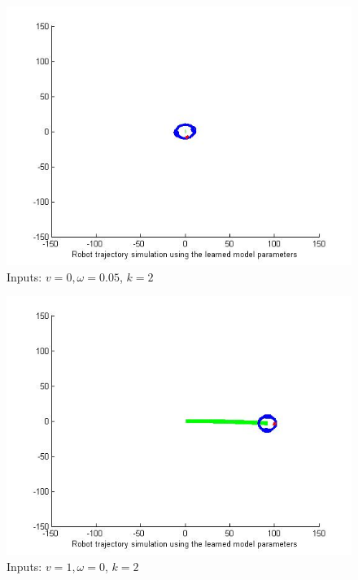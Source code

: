 \documentclass[10pt,a4paper]{report}
\begin{document}
\begin{figure}[!ht]
	\graphicspath{{./Exercise1/}}
	\centering
	\includegraphics[scale=0.5]{k_2_fig_2}	
	
	\begin{flushleft}
	\caption{Inputs: $v=0,\omega=0.05$, $k=2$}
	\end{flushleft}
	\label{fig:fig_2}
	
\end{figure}

\begin{figure}[!ht]
	\graphicspath{{./Exercise1/}}
	\centering
	\includegraphics[scale=0.5]{k_2_fig_3}	
	
	\begin{flushleft}
	\caption{Inputs: $v=1,\omega=0$, $k=2$}
	\end{flushleft}
	\label{fig:fig_3}
	
\end{figure}
\end{document}
